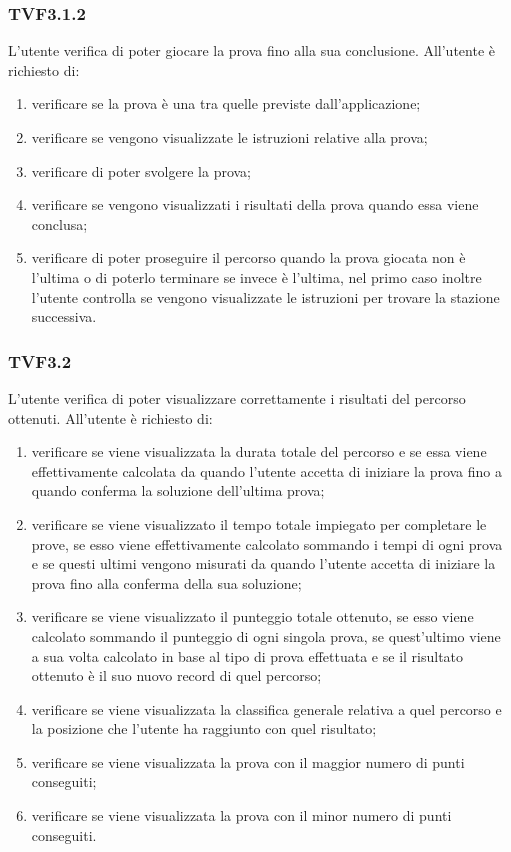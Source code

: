 		\subsubsection{TVF3.1.2}
			L'utente verifica di poter giocare la prova fino alla sua conclusione.
			All'utente è richiesto di:
			\begin{enumerate}
				\item verificare se la prova è una tra quelle previste dall'applicazione;
				\item verificare se vengono visualizzate le istruzioni relative alla prova;
				\item verificare di poter svolgere la prova;
				\item verificare se vengono visualizzati i risultati della prova quando essa viene conclusa;
				\item verificare di poter proseguire il percorso quando la prova giocata non è l'ultima o di poterlo terminare se invece è l'ultima, nel primo caso inoltre l'utente controlla se vengono visualizzate le istruzioni per trovare la stazione successiva.
			\end{enumerate}
		\subsubsection{TVF3.2}
			L'utente verifica di poter visualizzare correttamente i risultati del percorso ottenuti.
			All'utente è richiesto di:
			\begin{enumerate}
				\item verificare se viene visualizzata la durata totale del percorso e se essa viene effettivamente calcolata da quando l'utente accetta di iniziare la prova fino a quando conferma la soluzione dell'ultima prova;
				\item verificare se viene visualizzato il tempo totale impiegato per completare le prove, se esso viene effettivamente calcolato sommando i tempi di ogni prova e se questi ultimi vengono misurati da quando l'utente accetta di iniziare la prova fino alla conferma della sua soluzione;
				\item verificare se viene visualizzato il punteggio totale ottenuto, se esso viene calcolato sommando il punteggio di ogni singola prova, se quest'ultimo viene a sua volta calcolato in base al tipo di prova effettuata e se il risultato ottenuto è il suo nuovo record di quel percorso;
				\item verificare se viene visualizzata la classifica generale relativa a quel percorso e la posizione che l'utente ha raggiunto con quel risultato;
				\item verificare se viene visualizzata la prova con il maggior numero di punti conseguiti;
				\item verificare se viene visualizzata la prova con il minor numero di punti conseguiti.
			\end{enumerate}
